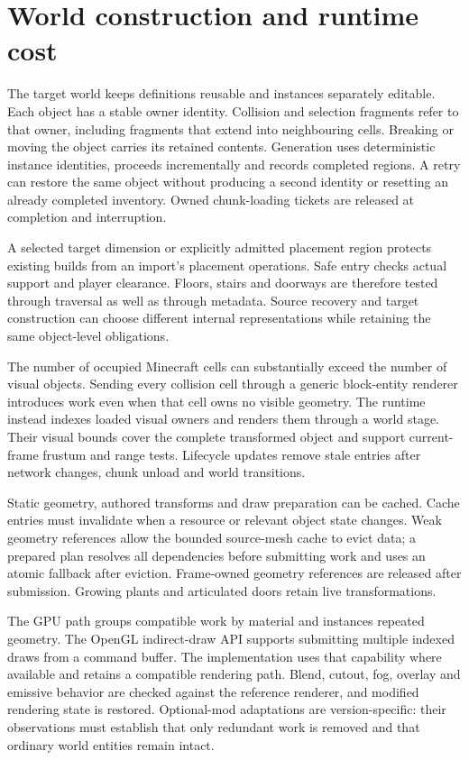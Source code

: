\documentclass[11pt]{article}
\begin{document}
\section{World construction and runtime cost}

The target world keeps definitions reusable and instances separately editable.
Each object has a stable owner identity. Collision and selection fragments refer
to that owner, including fragments that extend into neighbouring cells. Breaking
or moving the object carries its retained contents. Generation uses deterministic
instance identities, proceeds incrementally and records completed regions. A
retry can restore the same object without producing a second identity or
resetting an already completed inventory. Owned chunk-loading tickets are
released at completion and interruption.

A selected target dimension or explicitly admitted placement region protects
existing builds from an import's placement operations. Safe entry checks actual
support and player clearance. Floors, stairs and doorways are therefore tested
through traversal as well as through metadata. Source recovery and target
construction can choose different internal representations while retaining the
same object-level obligations.

The number of occupied Minecraft cells can substantially exceed the number of
visual objects. Sending every collision cell through a generic block-entity
renderer introduces work even when that cell owns no visible geometry. The
runtime instead indexes loaded visual owners and renders them through a world
stage. Their visual bounds cover the complete transformed object and support
current-frame frustum and range tests. Lifecycle updates remove stale entries
after network changes, chunk unload and world transitions.

Static geometry, authored transforms and draw preparation can be cached. Cache
entries must invalidate when a resource or relevant object state changes. Weak
geometry references allow the bounded source-mesh cache to evict data; a prepared
plan resolves all dependencies before submitting work and uses an atomic
fallback after eviction. Frame-owned geometry references are released after
submission. Growing plants and articulated doors retain live transformations.

The GPU path groups compatible work by material and instances repeated geometry.
The OpenGL indirect-draw API supports submitting multiple indexed draws from a
command buffer.\cite{opengl} The implementation uses that capability where
available and retains a compatible rendering path. Blend, cutout, fog, overlay
and emissive behavior are checked against the reference renderer, and modified
rendering state is restored. Optional-mod adaptations are version-specific:
their observations must establish that only redundant work is removed and that
ordinary world entities remain intact.
\end{document}
